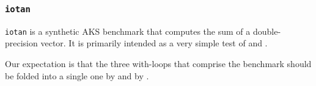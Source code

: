 \subsubsection{\tt iotan}
\label{benchmarkiotan}

{\tt iotan} is a synthetic AKS benchmark that computes the sum
of a double-precision vector. It is primarily intended as a very
simple test of \wlf and \awlf.

Our expectation is that the three with-loops that comprise the
benchmark should be folded into a single one by \wlf and by \awlf.

